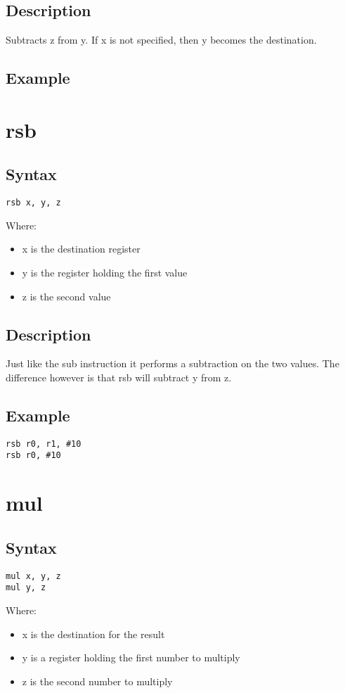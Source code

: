 \documentclass[11pt]{scrartcl}
\begin{document}
\subsection{Description}
Subtracts z from y. If x is not specified, then y becomes the destination.
\subsection{Example}

\section{rsb}
\subsection{Syntax}
\begin{verbatim}
rsb x, y, z
\end{verbatim}
Where:
\begin{itemize}
    \item x is the destination register
    \item y is the register holding the first value
    \item z is the second value
\end{itemize}
\subsection{Description}
Just like the sub instruction it performs a subtraction on the two values.
The difference however is that rsb will subtract y from z.
\subsection{Example}
\begin{verbatim}
rsb r0, r1, #10
rsb r0, #10
\end{verbatim}

\section{mul}
\subsection{Syntax}
\begin{verbatim}
mul x, y, z
mul y, z
\end{verbatim}
Where:
\begin{itemize}
    \item x is the destination for the result
    \item y is a register holding the first number to multiply
    \item z is the second number to multiply
\end{itemize}
\end{document}
